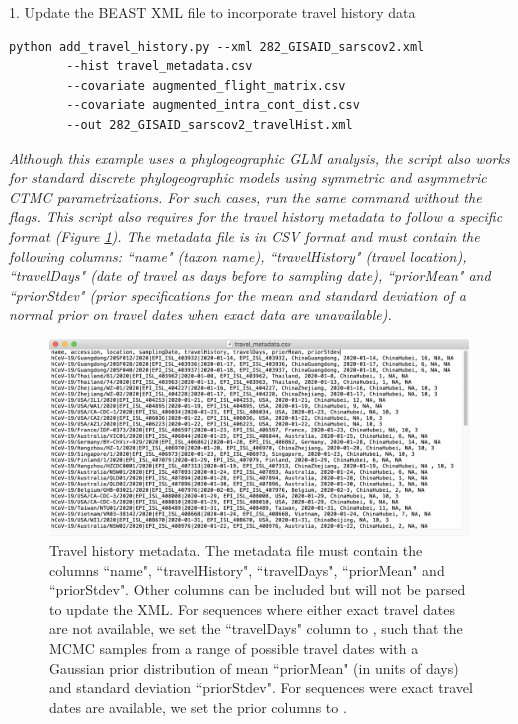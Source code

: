 \documentclass{article}
\newcommand{\ann}[1]{
\begin{adjustwidth}{0.5cm}{}
\it{#1}\\
\end{adjustwidth}}
\newcommand{\code}[1]{
{\upshape\ttfamily{#1}}}
\begin{document}
1. Update the BEAST XML file to incorporate travel history data
\begin{verbatim}
python add_travel_history.py --xml 282_GISAID_sarscov2.xml
        --hist travel_metadata.csv
        --covariate augmented_flight_matrix.csv
        --covariate augmented_intra_cont_dist.csv
        --out 282_GISAID_sarscov2_travelHist.xml
\end{verbatim}

\ann{Although this example uses a phylogeographic GLM analysis, the\code{add\_travel\_history.py} script also works for standard discrete phylogeographic models using symmetric and asymmetric CTMC parametrizations. For such cases, run the same command without the\code{--covariate} flags. This script also requires for the travel history metadata to follow a specific format (Figure \ref{fig:travmeta}).
The metadata file is in CSV format and must contain the following columns: ``name"  (taxon name), ``travelHistory"  (travel location), ``travelDays"  (date of travel as days before to sampling date), ``priorMean"  and ``priorStdev"  
(prior specifications for the mean and standard deviation of a normal prior on travel dates when exact data are unavailable).}

\begin{figure}[!ht]
    \centering
    \includegraphics[width=0.99\textwidth]{figs/travelhist.png}
    \caption{Travel history metadata. The metadata file must contain the columns ``name", ``travelHistory", ``travelDays", ``priorMean" and ``priorStdev". Other columns can be included but will not be parsed to update the XML. For sequences where either exact travel dates are not available, we set the ``travelDays" column to \code{NA}, such that the MCMC samples from a range of possible travel dates with a Gaussian prior distribution of mean ``priorMean" (in units of days) and standard deviation ``priorStdev". For sequences were exact travel dates are available, we set the prior columns to \code{NA}.}
    \label{fig:travmeta}
\end{figure}
\end{document}
